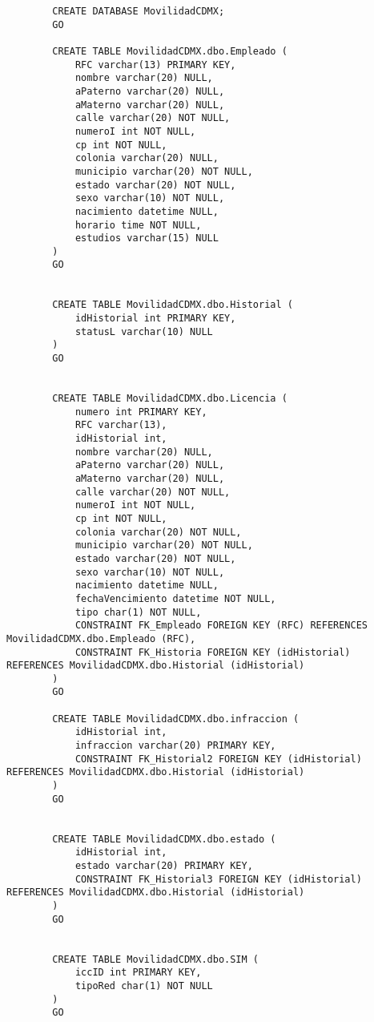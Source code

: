\documentclass[12pt, letterpaper]{article}
\begin{document}
    { \tiny
    \begin{lstlisting}
        CREATE DATABASE MovilidadCDMX;
        GO

        CREATE TABLE MovilidadCDMX.dbo.Empleado (
            RFC varchar(13) PRIMARY KEY,
            nombre varchar(20) NULL,
            aPaterno varchar(20) NULL,
            aMaterno varchar(20) NULL,
            calle varchar(20) NOT NULL,
            numeroI int NOT NULL,
            cp int NOT NULL,
            colonia varchar(20) NULL,
            municipio varchar(20) NOT NULL,
            estado varchar(20) NOT NULL,
            sexo varchar(10) NOT NULL,
            nacimiento datetime NULL,
            horario time NOT NULL,
            estudios varchar(15) NULL
        ) 	
        GO


        CREATE TABLE MovilidadCDMX.dbo.Historial (
            idHistorial int PRIMARY KEY,
            statusL varchar(10) NULL
        ) 
        GO


        CREATE TABLE MovilidadCDMX.dbo.Licencia (
            numero int PRIMARY KEY,
            RFC varchar(13),
            idHistorial int,
            nombre varchar(20) NULL,
            aPaterno varchar(20) NULL,
            aMaterno varchar(20) NULL,
            calle varchar(20) NOT NULL,
            numeroI int NOT NULL,
            cp int NOT NULL,
            colonia varchar(20) NOT NULL,
            municipio varchar(20) NOT NULL,
            estado varchar(20) NOT NULL,
            sexo varchar(10) NOT NULL,
            nacimiento datetime NULL,
            fechaVencimiento datetime NOT NULL,
            tipo char(1) NOT NULL,
            CONSTRAINT FK_Empleado FOREIGN KEY (RFC) REFERENCES MovilidadCDMX.dbo.Empleado (RFC),
            CONSTRAINT FK_Historia FOREIGN KEY (idHistorial) REFERENCES MovilidadCDMX.dbo.Historial (idHistorial)
        ) 
        GO

        CREATE TABLE MovilidadCDMX.dbo.infraccion (
            idHistorial int,
            infraccion varchar(20) PRIMARY KEY,
            CONSTRAINT FK_Historial2 FOREIGN KEY (idHistorial) REFERENCES MovilidadCDMX.dbo.Historial (idHistorial)
        ) 
        GO


        CREATE TABLE MovilidadCDMX.dbo.estado (
            idHistorial int,
            estado varchar(20) PRIMARY KEY,
            CONSTRAINT FK_Historial3 FOREIGN KEY (idHistorial) REFERENCES MovilidadCDMX.dbo.Historial (idHistorial)
        ) 
        GO


        CREATE TABLE MovilidadCDMX.dbo.SIM (
            iccID int PRIMARY KEY,
            tipoRed char(1) NOT NULL
        ) 
        GO



\end{lstlisting}}
\end{document}
